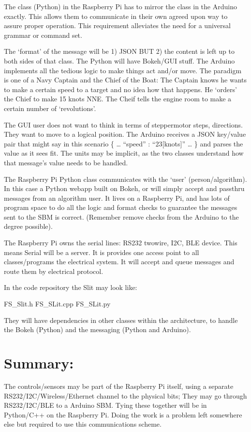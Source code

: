 \documentclass[letterpaper,10pt,english,openany,oneside]{sphinxmanual}
\begin{document}
\sphinxAtStartPar
The class (Python) in the Raspberry Pi has to mirror the class in the
Arduino exactly. This allows them to communicate in their own agreed
upon way to assure proper operation. This requirement alleviates
the need for a universal grammar or command set.

\sphinxAtStartPar
The ‘format’ of the message will be 1) JSON BUT 2) the content is left
up to both sides of that class.  The Python will have Bokeh/GUI
stuff. The Arduino implements all the tedious logic to make things act
and/or move. The paradigm is one of a Navy Captain and the Chief of
the Boat: The Captain knows he wants to make a certain speed to
a target and no idea how that happens. He ‘orders’ the Chief
to make 15 knots NNE. The Cheif tells the engine room to make
a certain number of ‘revolutions’.

\sphinxAtStartPar
The GUI user does not want to think in terms of stepper\sphinxhyphen{}motor
steps, directions. They want to move to a logical position.
The Arduino receives a JSON key/value pair that might say \textendash{}
in this scenario \textendash{} \{ … “speed” : “23{[}knots{]}” … \} and
parses the value as it sees fit. The units may be implicit, as
the two classes understand how that message’s value needs to
be handled.

\sphinxAtStartPar
The Raspberry Pi Python class communicates with the ‘user’
(person/algorithm). In this case a Python web\sphinxhyphen{}app built on Bokeh, or
will simply accept and pass\sphinxhyphen{}thru messages from an algorithm user. It
lives on a Raspberry Pi, and has lots of program space to do all the
logic and format checks to guarantee the messages sent to the SBM is
correct.  (Remember remove checks from the Arduino to the degree
possible).

\sphinxAtStartPar
The Raspberry Pi owns the serial lines: RS\sphinxhyphen{}232 two\sphinxhyphen{}wire, I2C, BLE
device.  This means Serial will be a server. It is provides one access
point to all classes/programs the electrical system. It will accept
and queue messages and route them by electrical protocol.

\sphinxAtStartPar
In the code repository the Slit may look like:

\sphinxAtStartPar
FS\_Slit.h
FS\_SLit.cpp
FS\_SLit.py

\sphinxAtStartPar
They will have dependencies in other classes within the architecture,
to handle the Bokeh (Python) and the messaging (Python and Arduino).


\section{Summary:}
\label{\detokenize{protocol:summary}}
\sphinxAtStartPar
The controls/sensors may be part of the Raspberry Pi itself, using a
separate RS\sphinxhyphen{}232/I2C/Wireless/Ethernet channel to the physical bits;
They may go through RS\sphinxhyphen{}232/I2C/BLE to a Arduino SBM. Tying these
together will be in Python/C++ on the Raspberry Pi. Doing the work is a
problem left somewhere else \textendash{} but required to use this communications
scheme.
\end{document}
